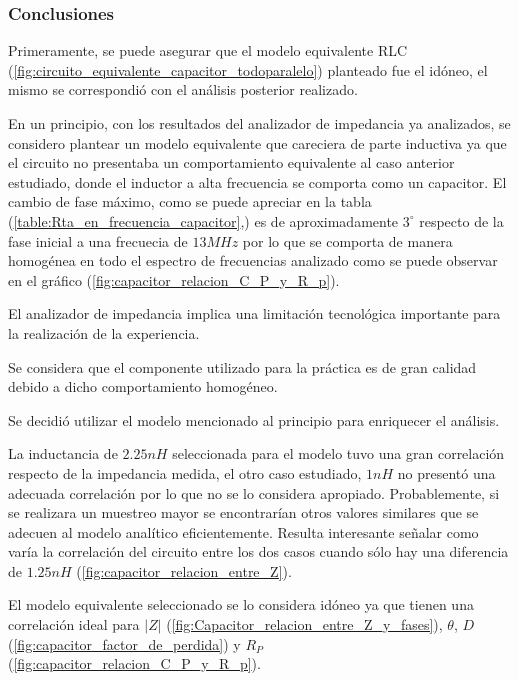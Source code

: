 \subsubsection*{Conclusiones}
Primeramente, se puede asegurar que el modelo equivalente RLC (\ref{fig:circuito_equivalente_capacitor_todoparalelo}) planteado fue el idóneo, el mismo se correspondió con el análisis posterior realizado. \par 
En un principio, con los resultados del analizador de impedancia  ya analizados, se considero plantear un modelo equivalente que careciera de parte inductiva ya que el circuito no presentaba un comportamiento equivalente al caso anterior estudiado, donde el inductor a alta frecuencia se comporta como un capacitor. El cambio de fase máximo, como se puede apreciar en la tabla (\ref{table:Rta_en_frecuencia_capacitor},) es de aproximadamente $3^\circ$ respecto de la fase inicial a una frecuecia de $13MHz$ por lo que se comporta de manera homogénea en todo el espectro de frecuencias analizado como se puede observar en el gráfico (\ref{fig:capacitor_relacion_C_P_y_R_p}).\par El analizador de impedancia implica una limitación tecnológica importante para la realización de la experiencia.\par
Se considera que el componente utilizado para la práctica es de gran calidad debido a dicho comportamiento homogéneo.\par
Se decidió utilizar el modelo mencionado al principio para enriquecer el análisis.\par
La inductancia de $2.25nH$ seleccionada para el modelo tuvo una gran correlación respecto de la impedancia medida, el otro caso estudiado, $1nH$ no presentó una adecuada correlación por lo que no se lo considera apropiado. Probablemente, si se realizara un muestreo mayor se encontrarían otros valores similares que se adecuen al modelo analítico eficientemente. Resulta interesante señalar como varía la correlación del circuito entre los dos casos cuando sólo hay una diferencia de $1.25nH$ (\ref{fig:capacitor_relacion_entre_Z}).
\par
El modelo equivalente seleccionado se lo considera idóneo ya que tienen una correlación ideal para $|Z|$ (\ref{fig:Capacitor_relacion_entre_Z_y_fases}), $\theta$, $D$(\ref{fig:capacitor_factor_de_perdida}) y $R_P$ (\ref{fig:capacitor_relacion_C_P_y_R_p}). \par


